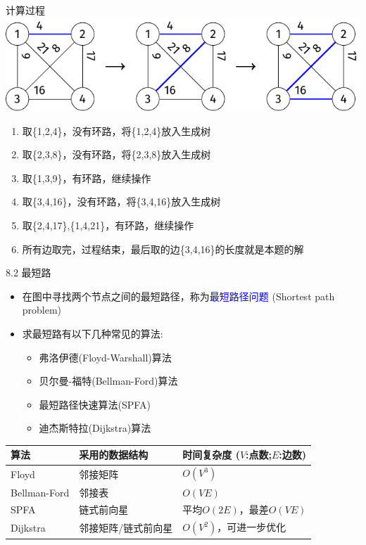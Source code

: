 \begin{frame}{计算过程}
    \includegraphics{fig/8-1.pdf}
\begin{enumerate}[(1)]
    \item 取\{1,2,4\}，没有环路，将\{1,2,4\}放入生成树\pause
    \item 取\{2,3,8\}，没有环路，将\{2,3,8\}放入生成树\pause
    \item 取\{1,3,9\}，有环路，继续操作\pause
    \item 取\{3,4,16\}，没有环路，将\{3,4,16\}放入生成树\pause
    \item 取\{2,4,17\},\{1,4,21\}，有环路，继续操作\pause
    \item 所有边取完，过程结束，最后取的边\{3,4,16\}的长度就是本题的解
\end{enumerate}
\end{frame}
\begin{frame}{8.2 最短路}
    \begin{itemize}
        \item 在图中寻找两个节点之间的最短路径，称为\textcolor{blue}{最短路径问题} (Shortest path problem)
        \item 求最短路有以下几种常见的算法:
        \begin{itemize}
            \item 弗洛伊德(Floyd-Warshall)算法
            \item 贝尔曼-福特(Bellman-Ford)算法
            \item 最短路径快速算法(SPFA)
            \item 迪杰斯特拉(Dijkstra)算法
        \end{itemize}
    \end{itemize}
    \begin{table}
        \begin{tabular}{m{2.4cm}|m{3.7cm}|m{4cm}}
            \textbf{算法} & \textbf{采用的数据结构} & \textbf{时间复杂度 \newline ($V$:点数;$E$:边数)}\\\hline
			Floyd        & 邻接矩阵                 & $O(V^3)$    \\\hline
			Bellman-Ford & 邻接表                   & $O(VE)$     \\\hline
			SPFA         & 链式前向星               & 平均$O(2E)$，最差$O(VE)$  \\\hline
			Dijkstra     & 邻接矩阵/链式前向星     & $O(V^2)$，可进一步优化   \\\hline
        \end{tabular}
    \end{table}
\end{frame}
